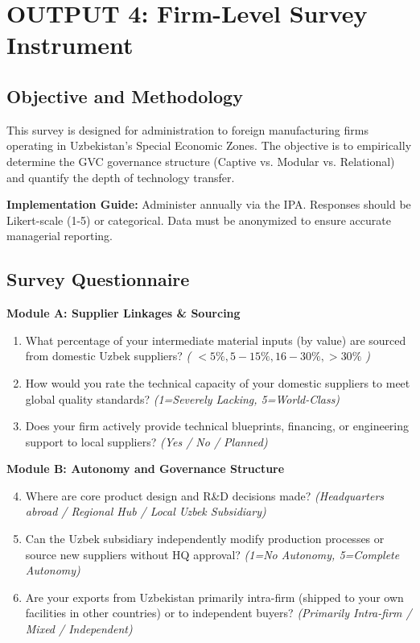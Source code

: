 \documentclass[11pt,a4paper]{article}
\begin{document}
\section{OUTPUT 4: Firm-Level Survey Instrument}

\subsection{Objective and Methodology}
This survey is designed for administration to foreign manufacturing firms operating in Uzbekistan's Special Economic Zones. The objective is to empirically determine the GVC governance structure (Captive vs. Modular vs. Relational) and quantify the depth of technology transfer. 

\textbf{Implementation Guide:} Administer annually via the IPA. Responses should be Likert-scale (1-5) or categorical. Data must be anonymized to ensure accurate managerial reporting.

\subsection{Survey Questionnaire}

\textbf{Module A: Supplier Linkages \& Sourcing}
\begin{enumerate}
    \item What percentage of your intermediate material inputs (by value) are sourced from domestic Uzbek suppliers? \textit{( $<5\%, 5-15\%, 16-30\%, >30\%$ )}
    \item How would you rate the technical capacity of your domestic suppliers to meet global quality standards? \textit{(1=Severely Lacking, 5=World-Class)}
    \item Does your firm actively provide technical blueprints, financing, or engineering support to local suppliers? \textit{(Yes / No / Planned)}
\end{enumerate}

\textbf{Module B: Autonomy and Governance Structure}
\begin{enumerate}
  \setcounter{enumi}{3}
    \item Where are core product design and R\&D decisions made? \textit{(Headquarters abroad / Regional Hub / Local Uzbek Subsidiary)}
    \item Can the Uzbek subsidiary independently modify production processes or source new suppliers without HQ approval? \textit{(1=No Autonomy, 5=Complete Autonomy)}
    \item Are your exports from Uzbekistan primarily intra-firm (shipped to your own facilities in other countries) or to independent buyers? \textit{(Primarily Intra-firm / Mixed / Independent)}
\end{enumerate}
\end{document}
